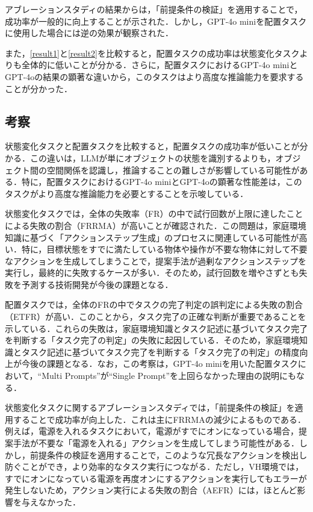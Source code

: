 アブレーションスタディの結果からは，「前提条件の検証」を適用することで，成功率が一般的に向上することが示された．しかし，GPT-4o miniを配置タスクに使用した場合には逆の効果が観察された．

また，\ref{result1}と\ref{result2}を比較すると，配置タスクの成功率は状態変化タスクよりも全体的に低いことが分かる．さらに，配置タスクにおけるGPT-4o miniとGPT-4oの結果の顕著な違いから，このタスクはより高度な推論能力を要求することが分かった．

\subsection{考察}\label{sec5.5}
状態変化タスクと配置タスクを比較すると，配置タスクの成功率が低いことが分かる．この違いは，LLMが単にオブジェクトの状態を識別するよりも，オブジェクト間の空間関係を認識し，推論することの難しさが影響している可能性がある．特に，配置タスクにおけるGPT-4o miniとGPT-4oの顕著な性能差は，このタスクがより高度な推論能力を必要とすることを示唆している．

状態変化タスクでは，全体の失敗率（FR）の中で試行回数が上限に達したことによる失敗の割合（FRRMA）が高いことが確認された．この問題は，家庭環境知識に基づく「アクションステップ生成」のプロセスに関連している可能性が高い．特に，目標状態をすでに満たしている物体や操作が不要な物体に対して不要なアクションを生成してしまうことで，提案手法が過剰なアクションステップを実行し，最終的に失敗するケースが多い．そのため，試行回数を増やさずとも失敗を予測する技術開発が今後の課題となる．

配置タスクでは，全体のFRの中でタスクの完了判定の誤判定による失敗の割合（ETFR）が高い．このことから，タスク完了の正確な判断が重要であることを示している．これらの失敗は，家庭環境知識とタスク記述に基づいてタスク完了を判断する「タスク完了の判定」の失敗に起因している．そのため，家庭環境知識とタスク記述に基づいてタスク完了を判断する「タスク完了の判定」の精度向上が今後の課題となる．なお，この考察は，GPT-4o miniを用いた配置タスクにおいて，``Multi Prompts''が``Single Prompt''を上回らなかった理由の説明にもなる．

状態変化タスクに関するアブレーションスタディでは，「前提条件の検証」を適用することで成功率が向上した．これは主にFRRMAの減少によるものである．例えば，電源を入れるタスクにおいて，電源がすでにオンになっている場合，提案手法が不要な「電源を入れる」アクションを生成してしまう可能性がある．しかし，前提条件の検証を適用することで，このような冗長なアクションを検出し防ぐことができ，より効率的なタスク実行につながる．ただし，VH環境では，すでにオンになっている電源を再度オンにするアクションを実行してもエラーが発生しないため，アクション実行による失敗の割合（AEFR）には，ほとんど影響を与えなかった．

